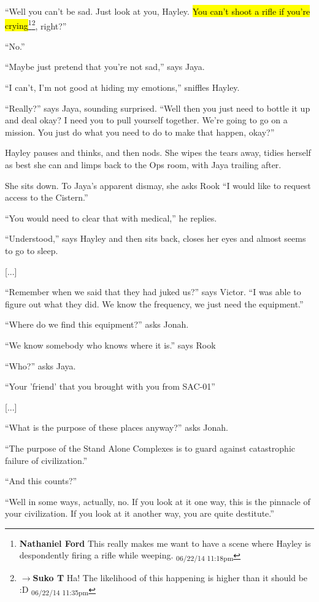 ``Well you can't be sad.  Just look at you, Hayley.  \hl{You can't shoot a rifle if you're crying}\footnote{\textbf{Nathaniel Ford }This really makes me want to have a scene where Hayley is despondently firing a rifle while weeping. \textsubscript{06/22/14 11:18pm}}\footnote{$\rightarrow$\textbf{Suko T }Ha!  The likelihood of this happening is higher than it should be :D \textsubscript{06/22/14 11:35pm}}, right?''

``No.''

``Maybe just pretend that you're not sad,'' says Jaya.

``I can't, I'm not good at hiding my emotions,'' sniffles Hayley.

``Really?'' says Jaya, sounding surprised.  ``Well then you just need to bottle it up and deal okay?  I need you to pull yourself together.  We're going to go on a mission.  You just do what you need to do to make that happen, okay?''

Hayley pauses and thinks, and then nods.  She wipes the tears away, tidies herself as best she can and limps back to the Ops room, with Jaya trailing after.



She sits down.  To Jaya's apparent dismay, she asks Rook ``I would like to request access to the Cistern.''

``You would need to clear that with medical,'' he replies.

``Understood,'' says Hayley and then sits back, closes her eyes and almost seems to go to sleep.

{[}...{]}

``Remember when we said that they had juked us?'' says Victor.  ``I was able to figure out what they did.  We know the frequency, we just need the equipment.''

``Where do we find this equipment?'' asks Jonah.

``We know somebody who knows where it is.'' says Rook

``Who?'' asks Jaya.

``Your 'friend' that you brought with you from SAC-01'' 

{[}...{]}

``What is the purpose of these places anyway?'' asks Jonah.

``The purpose of the Stand Alone Complexes is to guard against catastrophic failure of civilization.''

``And this counts?''

``Well in some ways, actually, no.  If you look at it one way, this is the pinnacle of your civilization. If you look at it another way, you are quite destitute.''

